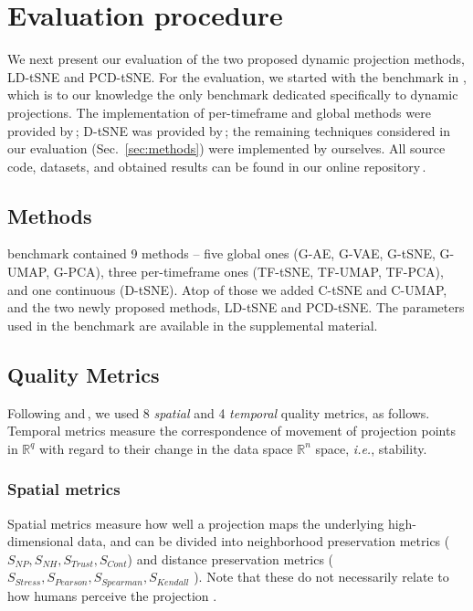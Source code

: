 \section{Evaluation procedure} 
\label{sec:experimental-setup}
%
We next present our evaluation of the two proposed dynamic projection methods, LD-tSNE and PCD-tSNE. For the evaluation, we started with the benchmark in \cite{Vernier2020}, which is to our knowledge the only benchmark dedicated specifically to dynamic projections. The implementation of per-timeframe and global methods were provided by\,\cite{Vernier2020}; D-tSNE was provided by\,\cite{Rauber2016};  the remaining techniques considered in our evaluation (Sec.~\ref{sec:methods}) were implemented by ourselves. All source code, datasets, and obtained results can be found in our online repository\,\citep{repo-guided}. 

\subsection{Methods}
\label{sec:eval-methods}

\cite{Vernier2020} benchmark contained 9 methods -- five global ones (G-AE, G-VAE, G-tSNE, G-UMAP, G-PCA), three per-timeframe ones (TF-tSNE, TF-UMAP, TF-PCA), and one continuous (D-tSNE). 
Atop of those we added C-tSNE and C-UMAP, and the two newly proposed methods, LD-tSNE and PCD-tSNE. The parameters used in the benchmark are available in the supplemental material.

\subsection{Quality Metrics}
\label{sec:metrics}
%
Following \cite{Vernier2020} and\,\cite{Espadoto19}, we used 8 \emph{spatial} and 4 \emph{temporal} quality metrics, as follows. Temporal metrics measure the correspondence of movement of projection points in $\mathbb{R}^q$ with regard to their change in the data space $\mathbb{R}^n$ space, \emph{i.e.}, stability. 

\subsubsection{Spatial metrics}
\label{sec:spatial}

Spatial metrics measure how well a projection maps the underlying high-dimensional data, and can be divided into neighborhood preservation metrics ($S_{NP}, S_{NH}, S_{Trust}, S_{Cont}$) and distance preservation metrics ($S_{Stress}, S_{Pearson}, S_{Spearman}, S_{Kendall}$ ). Note that these do not necessarily relate to how humans perceive the projection \citep{Wang2018}.

